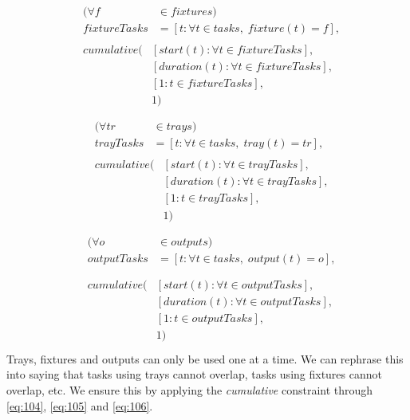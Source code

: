  \begin{equation}
 \begin{aligned}\label{eq:104}
 &\begin{aligned}
 (\forall f &\in fixtures) \\
 fixtureTasks &= [t : \forall t \in tasks, \; fixture(t) = f], 
 \end{aligned}\\
 &\begin{aligned}
 cumulative(&[start(t) : \forall t \in fixtureTasks],\\
 &[duration(t) : \forall t \in fixtureTasks],\\
 &[1 : t \in fixtureTasks],\\
 &1)
 \end{aligned}\\
 \end{aligned}
 \end{equation}
 \begin{equation}
 \begin{aligned}\label{eq:105}
 &\begin{aligned}
 (\forall tr &\in trays) \\
 trayTasks &= [t : \forall t \in tasks, \; tray(t) = tr], 
 \end{aligned}\\
 &\begin{aligned}
 cumulative(&[start(t) : \forall t \in trayTasks],\\
 &[duration(t) : \forall t \in trayTasks],\\
 &[1 : t \in trayTasks],\\
 &1)
 \end{aligned}\\
 \end{aligned}
 \end{equation}
 \begin{equation}
 \begin{aligned}\label{eq:106}
 &\begin{aligned}
 (\forall o &\in outputs) \\
 outputTasks &= [t : \forall t \in tasks, \; output(t) = o], \\
 \end{aligned}\\
 &\begin{aligned}
 cumulative(&[start(t) : \forall t \in outputTasks], \\
 &[duration(t) : \forall t \in outputTasks], \\
 &[1 : t \in outputTasks], \\
 &1)
 \end{aligned}\\
 \end{aligned}
 \end{equation}
Trays, fixtures and outputs can only be used one at a time. We can rephrase this into saying that tasks using trays cannot overlap, tasks using fixtures cannot overlap, etc. We ensure this by applying the \emph{cumulative} constraint through \ref{eq:104}, \ref{eq:105} and \ref{eq:106}.
 
